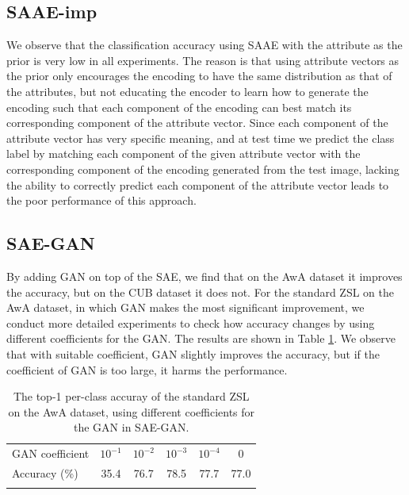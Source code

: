 \documentclass{article}
\begin{document}
\subsection{SAAE-imp}

We observe that the classification accuracy using SAAE with the attribute as the prior is very low in all experiments. The reason is that using attribute vectors as the prior only encourages the encoding to have the same distribution as that of the attributes, but not educating the encoder to learn how to generate the encoding such that each component of the encoding can best match its corresponding component of the attribute vector. Since each component of the attribute vector has very specific meaning, and at test time we predict the class label by matching each component of the given attribute vector with the corresponding component of the encoding generated from the test image, lacking the ability to correctly predict each component of the attribute vector leads to the poor performance of this approach.


\subsection{SAE-GAN}

By adding GAN on top of the SAE, we find that on the AwA dataset it improves the accuracy, but on the CUB dataset it does not. For the standard ZSL on the AwA dataset, in which GAN makes the most significant improvement, we conduct more detailed experiments to check how accuracy changes by using different coefficients for the GAN. The results are shown in Table \ref{tab:SAEGAN}. We observe that with suitable coefficient, GAN slightly improves the accuracy, but if the coefficient of GAN is too large, it harms the performance.


\begin{table}[t]
\centering
\begin{tabular}{lccccc}
\toprule
GAN coefficient & $10^{-1}$ & $10^{-2}$ & $10^{-3}$ & $10^{-4}$ & 0 \\
Accuracy (\%) & 35.4 & 76.7 & 78.5 & 77.7 & 77.0 \\
\bottomrule \\
\end{tabular}
\caption{The top-1 per-class accuray of the standard ZSL on the AwA dataset, using different coefficients for the GAN in SAE-GAN.}
\label{tab:SAEGAN}
\end{table}


\end{document}
